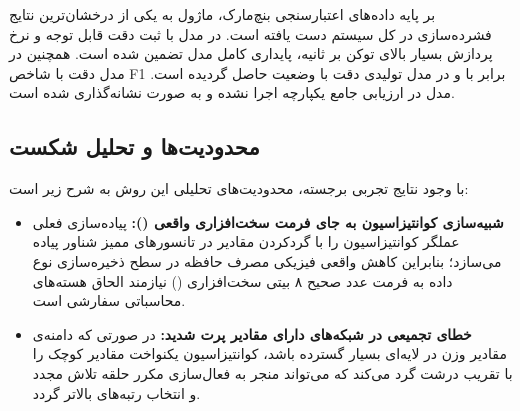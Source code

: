 بر پایه داده‌های اعتبارسنجی بنچ‌مارک، ماژول  به یکی از درخشان‌ترین نتایج فشرده‌سازی در کل سیستم دست یافته است. در مدل  با ثبت دقت قابل توجه  و نرخ پردازش بسیار بالای  توکن بر ثانیه، پایداری کامل مدل تضمین شده است. همچنین در مدل  دقت  با شاخص F1 برابر با  و در مدل تولیدی  دقت  با وضعیت  حاصل گردیده است. مدل  در ارزیابی جامع یکپارچه اجرا نشده و به صورت  نشانه‌گذاری شده است.

\subsection{محدودیت‌ها و تحلیل شکست}
با وجود نتایج تجربی برجسته، محدودیت‌های تحلیلی این روش به شرح زیر است:
\begin{itemize}
    \item \textbf{شبیه‌سازی کوانتیزاسیون به جای فرمت سخت‌افزاری واقعی ():} پیاده‌سازی فعلی عملگر کوانتیزاسیون را با گردکردن مقادیر در تانسورهای ممیز شناور پیاده می‌سازد؛ بنابراین کاهش واقعی فیزیکی مصرف حافظه در سطح ذخیره‌سازی نوع داده به فرمت عدد صحیح ۸ بیتی سخت‌افزاری () نیازمند الحاق هسته‌های محاسباتی سفارشی است.
    \item \textbf{خطای تجمیعی در شبکه‌های دارای مقادیر پرت شدید:} در صورتی که دامنه‌ی مقادیر وزن در لایه‌ای بسیار گسترده باشد، کوانتیزاسیون یکنواخت مقادیر کوچک را با تقریب درشت گرد می‌کند که می‌تواند منجر به فعال‌سازی مکرر حلقه تلاش مجدد و انتخاب رتبه‌های بالاتر گردد.
\end{itemize}
